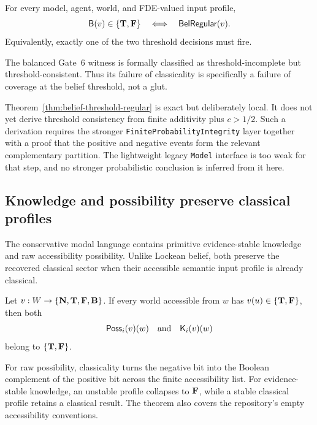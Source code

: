 \begin{theorem}
\label{thm:belief-threshold-regular}
For every model, agent, world, and FDE-valued input profile,
\[
  \mathsf{B}(v)\in\{\mathbf{T},\mathbf{F}\}
  \quad\Longleftrightarrow\quad
  \mathsf{BelRegular}(v).
\]
Equivalently, exactly one of the two threshold decisions must fire.
\statusverified
\end{theorem}

The balanced Gate~6 witness is formally classified as threshold-incomplete but
threshold-consistent.  Thus its failure of classicality is specifically a failure of
coverage at the belief threshold, not a glut.

Theorem~\ref{thm:belief-threshold-regular} is exact but deliberately local.  It does
not yet derive threshold consistency from finite additivity plus \(c>1/2\).  Such a
derivation requires the stronger \texttt{FiniteProbabilityIntegrity} layer together
with a proof that the positive and negative events form the relevant complementary
partition.  The lightweight legacy \texttt{Model} interface is too weak for that
step, and no stronger probabilistic conclusion is inferred from it here.

\subsection{Knowledge and possibility preserve classical profiles}

The conservative modal language contains primitive evidence-stable knowledge and raw
accessibility possibility.  Unlike Lockean belief, both preserve the recovered
classical sector when their accessible semantic input profile is already classical.

\begin{theorem}
\label{thm:modal-classical-preservation}
Let \(v:W\to\{\mathbf{N},\mathbf{T},\mathbf{F},\mathbf{B}\}\).  If every world accessible from
\(w\) has \(v(u)\in\{\mathbf{T},\mathbf{F}\}\), then both
\[
  \mathsf{Poss}_i(v)(w)
  \quad\text{and}\quad
  \mathsf{K}_i(v)(w)
\]
belong to \(\{\mathbf{T},\mathbf{F}\}\).
\statusverified
\end{theorem}

For raw possibility, classicality turns the negative bit into the Boolean complement
of the positive bit across the finite accessibility list.  For evidence-stable
knowledge, an unstable profile collapses to \(\mathbf{F}\), while a stable classical
profile retains a classical result.  The theorem also covers the repository's empty
accessibility conventions.

